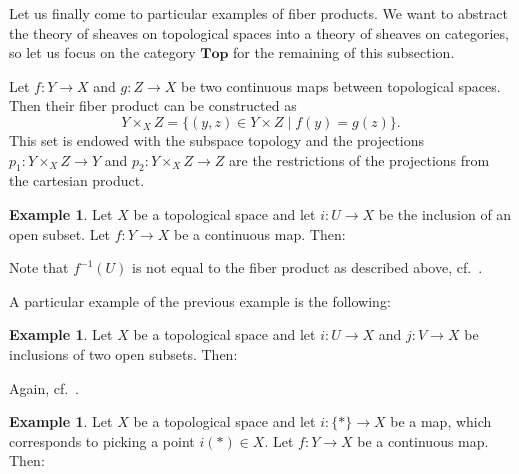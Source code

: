 \documentclass[12pt,reqno,a4paper]{amsart}
\theoremstyle{plain}
\theoremstyle{definition}
\newtheorem{exmp}[thm]{Example}
\theoremstyle{remark}
\begin{document}
Let us finally come to particular examples of fiber products.
We want to abstract the theory of sheaves on topological spaces into a theory of sheaves on categories, so let us focus on the category $\mathbf{Top}$ for the remaining of this subsection.

Let $f \colon Y \to X$ and $g \colon Z \to X$ be two continuous maps between topological spaces.
Then their fiber product can be constructed as
\[ Y \times_{X} Z = \{ (y,z) \in Y \times Z \mid f(y) = g(z) \}. \]
This set is endowed with the subspace topology and the projections $p_{1} \colon Y \times_{X} Z \to Y$ and $p_{2} \colon Y \times_{X} Z \to Z$ are the restrictions of the projections from the cartesian product.

\begin{exmp}\label{exmp:preimage}
  Let $X$ be a topological space and let $i \colon U \to X$ be the inclusion of an open subset.
  Let $f \colon Y \to X$ be a continuous map.
  Then:
  \begin{center}
  \end{center}
  Note that $f^{-1}(U)$ is not equal to the fiber product as described above, cf.~.
\end{exmp}

A particular example of the previous example is the following:

\begin{exmp}
  Let $X$ be a topological space and let $i \colon U \to X$ and $j \colon V \to X$ be inclusions of two open subsets.
  Then:
  \begin{center}
  \end{center}
  Again, cf.~.
\end{exmp}

\begin{exmp}\label{exmp:fiber}
  Let $X$ be a topological space and let $i \colon \{ * \} \to X$ be a map, which corresponds to picking a point $i(*) \in X$.
  Let $f \colon Y \to X$ be a continuous map.
  Then:
  \begin{center}
  \end{center}
\end{exmp}
\end{document}
